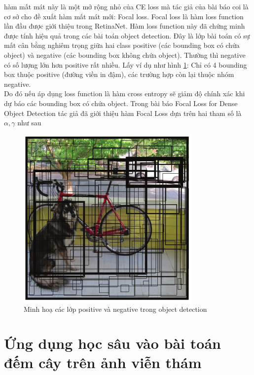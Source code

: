 \documentclass[a4paper, 12pt]{report}
\begin{document}
hàm mất mát này là một mở rộng nhỏ của CE loss mà tác giả của bài báo coi là cơ sở cho đề xuất hàm mất mát mới: Focal loss. Focal loss là hàm loss function lần đầu được giới thiệu trong RetinaNet. Hàm loss function này đã chứng minh được tính hiệu quả trong các bài toán object detection. Đây là lớp bài toán có sự mất cân bằng nghiêm trọng giữa hai class positive (các bounding box có chứa object) và negative (các bounding box không chứa object). Thường thì negative có số lượng lớn hơn positive rất nhiều. Lấy ví dụ như hình \ref{fig:pos-neg}: Chỉ có 4 bounding box thuộc positive (đường viền in đậm), các trường hợp còn lại thuộc nhóm negative. \\
Do đó nếu áp dụng loss function là hàm cross entropy sẽ giảm độ chính xác khi dự báo các bounding box có chứa object. Trong bài báo Focal Loss for Dense Object Detection tác giả đã giới thiệu hàm Focal Loss dựa trên hai tham số là $\alpha, \gamma$ như sau


\begin{figure}[!h]
	\centering
	\includegraphics[width=0.5\linewidth]{Images/dog_bike}
	\caption{Minh hoạ các lớp positive và negative trong object detection}
	\label{fig:pos-neg}
\end{figure} 




\chapter{Ứng dụng học sâu vào bài toán đếm cây trên ảnh viễn thám}
\end{document}
